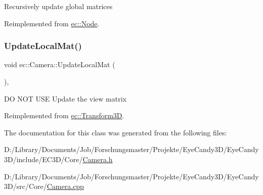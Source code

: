 Recursively update global matrices 

Reimplemented from \mbox{\hyperlink{classec_1_1_node_ac9970ec0ec03e130da59d0d5376a9855}{ec\+::\+Node}}.

\mbox{\label{classec_1_1_camera_ab9b2d59d1755a56d67c13a5539b7e033}} 
\subsubsection{\texorpdfstring{Update\+Local\+Mat()}{UpdateLocalMat()}}
{\footnotesize\ttfamily void ec\+::\+Camera\+::\+Update\+Local\+Mat (\begin{DoxyParamCaption}{ }\end{DoxyParamCaption})\hspace{0.3cm}{\ttfamily [override]}, {\ttfamily [virtual]}}

DO N\+OT U\+SE Update the view matrix 

Reimplemented from \mbox{\hyperlink{classec_1_1_transform3_d_a9af1af38089385c5b2100fe5f98f33ca}{ec\+::\+Transform3D}}.



The documentation for this class was generated from the following files\+:\begin{DoxyCompactItemize}
\item 
D\+:/\+Library/\+Documents/\+Job/\+Forschungsmaster/\+Projekte/\+Eye\+Candy3\+D/\+Eye\+Candy3\+D/include/\+E\+C3\+D/\+Core/\mbox{\hyperlink{_camera_8h}{Camera.\+h}}\item 
D\+:/\+Library/\+Documents/\+Job/\+Forschungsmaster/\+Projekte/\+Eye\+Candy3\+D/\+Eye\+Candy3\+D/src/\+Core/\mbox{\hyperlink{_camera_8cpp}{Camera.\+cpp}}\end{DoxyCompactItemize}

